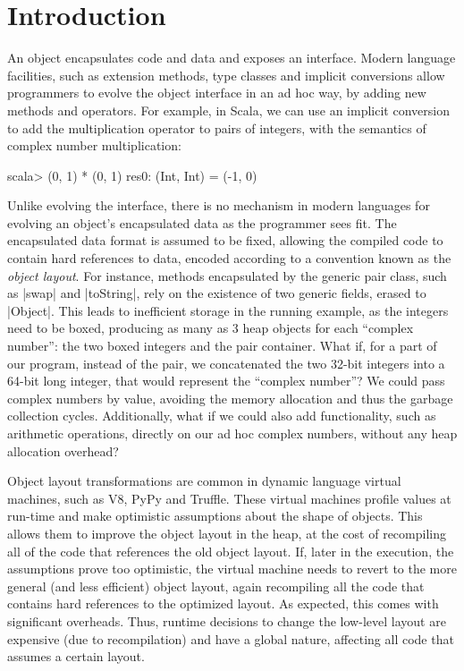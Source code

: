 \section{Introduction}
\label{sec:intro}

An object encapsulates code and data and exposes an interface. Modern
language facilities, such as extension methods, type classes and
implicit conversions allow programmers to evolve the object interface
in an ad hoc way, by adding new methods and operators. For example, in
Scala, we can use an implicit conversion to add the multiplication
operator to pairs of integers, with the semantics of complex number
multiplication:

\begin{lstlisting-nobreak}
scala> (0, 1) * (0, 1)
res0: (Int, Int) = (-1, 0)
\end{lstlisting-nobreak}

Unlike evolving the interface, there is no mechanism in modern
languages for evolving an object's encapsulated data as the programmer sees fit. The
encapsulated data format is assumed to be fixed, allowing the compiled
code to contain hard references to data, encoded according to a convention known as the
\emph{object layout}. For instance, methods encapsulated
by the generic pair class, such as |swap| and |toString|, rely on the
existence of two generic fields, erased to |Object|. This leads to
inefficient storage in the running example, as the integers need to be boxed, producing as many as
3 heap objects for each ``complex number'': the two boxed integers and
the pair container. What if, for a part of  our program, instead of the pair, we
concatenated the two 32-bit integers into a 64-bit long integer, that
would represent the ``complex number''? We could pass complex numbers by value,
avoiding the memory allocation and thus the garbage collection cycles. Additionally, what if we could also add
functionality, such as arithmetic operations, directly on our ad hoc complex
numbers, without any heap allocation overhead? %

Object layout transformations are common in dynamic language virtual
machines, such as V8, PyPy and Truffle. These virtual machines profile
values at run-time and make optimistic assumptions about the shape of
objects. This allows them to improve the object layout
in the heap, at the cost of recompiling all of the code that references
the old object layout.
If, later in the execution, the assumptions prove too optimistic, the
virtual machine needs to revert to the more general (and less
efficient) object layout, again recompiling all the code that contains
hard references to the optimized layout. As expected, this comes with
significant overheads. Thus, runtime decisions to change the
low-level layout are expensive (due to recompilation) and
have a global nature, affecting all code that assumes a certain layout.

